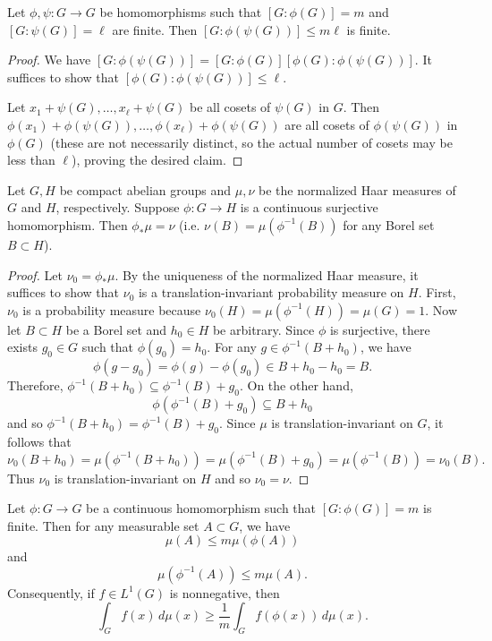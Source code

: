 \begin{lemma} \label{lem:composition}
Let $\phi, \psi: G \rightarrow G$ be  homomorphisms such that $[G:\phi(G)] = m$ and $[G:\psi(G)] = \ell$ are finite. Then
$[G: \phi ( \psi (G))] \leq m\ell$ is finite.
\end{lemma}
\begin{proof}
We have $[G:\phi(\psi(G))] = [G:\phi(G)] [\phi(G): \phi(\psi(G))]$. It suffices to show that $[\phi(G): \phi(\psi(G))] \leq \ell$. 

Let $x_1 + \psi(G), \ldots, x_\ell + \psi(G)$ be all cosets of $\psi(G)$ in $G$. Then $\phi(x_1) + \phi(\psi(G)), \ldots, \phi(x_\ell) + \phi(\psi(G))$ are all cosets of $\phi(\psi(G))$ in $\phi(G)$ (these are not necessarily distinct, so the actual number of cosets may be less than $\ell$), proving the desired claim. 
\end{proof}

\begin{lemma}
\label{lem:pushforward}
    Let $G, H$ be compact abelian groups and $\mu, \nu$ be the normalized Haar measures of $G$ and $H$, respectively. Suppose $\phi: G \to H$ is a continuous surjective homomorphism. Then $\phi_* \mu = \nu$ (i.e. $\nu(B) = \mu( \phi^{-1}(B))$ for any Borel set $B \subset H$).
\end{lemma}
\begin{proof}
    Let $\nu_0 = \phi_* \mu$. By the uniqueness of the normalized Haar measure, it suffices to show that $\nu_0$ is a translation-invariant probability measure on $H$. First, $\nu_0$ is a probability measure because $\nu_0(H) = \mu(\phi^{-1}(H)) = \mu(G) = 1$. Now let $B \subset H$ be a Borel set and $h_0 \in H$ be arbitrary. Since $\phi$ is surjective, there exists $g_0 \in G$ such that $\phi(g_0) = h_0$. For any $g \in \phi^{-1}(B + h_0)$, we have
    \[
        \phi(g - g_0) = \phi(g) - \phi(g_0) \in B + h_0 - h_0 = B.
    \]
    Therefore, $\phi^{-1}(B + h_0) \subseteq \phi^{-1}(B) + g_0.$ On the other hand, 
    \[
        \phi(\phi^{-1}(B) + g_0) \subseteq B + h_0
    \]
    and so $\phi^{-1}(B + h_0) = \phi^{-1}(B) + g_0$. Since $\mu$ is translation-invariant on $G$, it follows that
    \[
        \nu_0(B + h_0) = \mu(\phi^{-1}(B + h_0)) = \mu(\phi^{-1}(B) + g_0) = \mu(\phi^{-1}(B)) = \nu_0(B).
    \]
    Thus $\nu_0$ is translation-invariant on $H$ and so $\nu_0 = \nu$. 
\end{proof}


\begin{lemma} \label{lem:finite-index}
Let $\phi:G \rightarrow G$ be a continuous homomorphism such that $[G:\phi(G)]=m$ is finite. Then for any measurable set $A \subset G$, we have 
\begin{equation}
\mu( A ) \leq m \mu( \phi(A) )
\end{equation}
and
\begin{equation}
\mu( \phi^{-1}(A) ) \leq m \mu( A ).
\end{equation}
Consequently, if $f \in L^1(G)$ is nonnegative, then
\[
\int_G f(x) \, d\mu(x) \geq \frac{1}{m} \int_G f( \phi(x) ) \, d\mu(x).
\]
\end{lemma}

